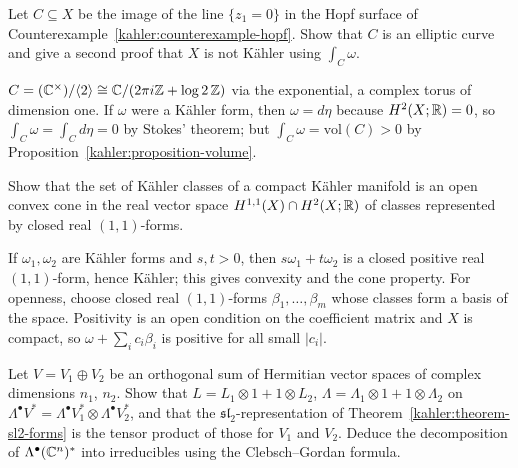 \begin{exercise}\label{kahler:exercise-hopf-direct}
Let $C \subseteq X$ be the image of the line $\{z_1 = 0\}$ in the Hopf surface of Counterexample~\ref{kahler:counterexample-hopf}. Show that $C$ is
an elliptic curve and give a second proof that $X$ is not K\"ahler using $\int_C\omega$.
\end{exercise}

\begin{solution}
$C = (\mathbb{C}^\times)/\langle 2\rangle \cong \mathbb{C}/(2\pi i\mathbb{Z} + \log 2\,\mathbb{Z})$ via the exponential, a complex torus of dimension one. If $\omega$ were a
K\"ahler form, then $\omega = d\eta$ because $H^2(X; \mathbb{R}) = 0$, so $\int_C\omega = \int_Cd\eta = 0$ by Stokes' theorem; but
$\int_C\omega = \mathrm{vol}(C) > 0$ by Proposition~\ref{kahler:proposition-volume}.
\end{solution}

\begin{exercise}\label{kahler:exercise-kahler-cone}
Show that the set of K\"ahler classes of a compact K\"ahler manifold is an open convex cone in the real vector space
$H^{1,1}(X) \cap H^2(X; \mathbb{R})$ of classes represented by closed real $(1,1)$-forms.
\end{exercise}

\begin{solution}
If $\omega_1, \omega_2$ are K\"ahler forms and $s, t > 0$, then $s\omega_1 + t\omega_2$ is a closed positive real $(1,1)$-form, hence K\"ahler; this
gives convexity and the cone property. For openness, choose closed real $(1,1)$-forms $\beta_1, \ldots, \beta_m$ whose classes form a basis of the
space. Positivity is an open condition on the coefficient matrix and $X$ is compact, so $\omega + \sum_ic_i\beta_i$ is positive for all small
$|c_i|$.
\end{solution}

\begin{exercise}\label{kahler:exercise-product-lefschetz}
Let $V = V_1 \oplus V_2$ be an orthogonal sum of Hermitian vector spaces of complex dimensions $n_1$, $n_2$. Show that
$L = L_1 \otimes 1 + 1 \otimes L_2$, $\Lambda = \Lambda_1 \otimes 1 + 1 \otimes \Lambda_2$ on $\Lambda^\bullet V^* = \Lambda^\bullet V_1^* \otimes \Lambda^\bullet V_2^*$,
and that the $\mathfrak{sl}_2$-representation of Theorem~\ref{kahler:theorem-sl2-forms} is the tensor product of those for $V_1$ and $V_2$.
Deduce the decomposition of $\Lambda^\bullet(\mathbb{C}^n)^*$ into irreducibles using the Clebsch--Gordan formula.
\end{exercise}

